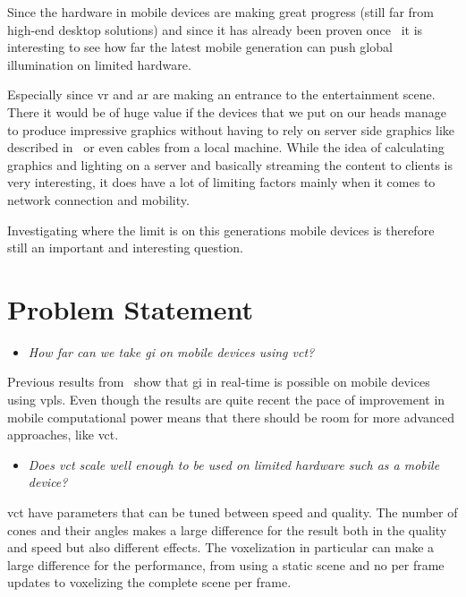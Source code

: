Since the hardware in mobile devices are making great progress (still far from high-end desktop solutions) and since it has already been proven once~\cite{gimobile} it is interesting to see how far the latest mobile generation can push global illumination on limited hardware.

Especially since \gls{vr} and \gls{ar} are making an entrance to the entertainment scene.
There it would be of huge value if the devices that we put on our heads manage to produce impressive graphics without having to rely on server side graphics like described in~\cite{cloudlight} or even cables from a local machine. 
While the idea of calculating graphics and lighting on a server and basically streaming the content to clients is very interesting, it does have a lot of limiting factors mainly when it comes to network connection and mobility.

Investigating where the limit is on this generations mobile devices is therefore still an important and interesting question.

\section{Problem Statement}

\begin{itemize}
  \item \textit{How far can we take \gls{gi} on mobile devices using \gls{vct}?}
\end{itemize}

Previous results from~\cite{gimobile} show that \gls{gi} in real-time is possible on mobile devices using \glspl{vpl}. 
Even though the results are quite recent the pace of improvement in mobile computational power means that there should be room for more advanced approaches, like \gls{vct}.

\begin{itemize}
  \item \textit{Does \gls{vct} scale well enough to be used on limited hardware such as a mobile device?}
\end{itemize}

\gls{vct} have parameters that can be tuned between speed and quality. 
The number of cones and their angles makes a large difference for the result both in the quality and speed but also different effects. 
The voxelization in particular can make a large difference for the performance, from using a static scene and no per frame updates to voxelizing the complete scene per frame.

